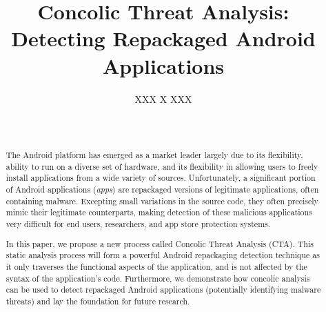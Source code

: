 \documentclass{sig-alternate}
\newif\ifisnopii
\begin{document}
%

\title{Concolic Threat Analysis: Detecting Repackaged Android Applications}
%
\ifisnopii %
\author{
%
\alignauthor
Daniel E. Krutz, Samuel A. Malachowsky, Patrick J. McAfee, and Justin M. Peterson\\ 	
	\affaddr{Software Engineering Department}\\
       \affaddr{Rochester Institute of Technology}\\
       \affaddr{1 Lomb Memorial Drive}\\
       \affaddr{Rochester, NY 14623} \\
       \email{\{dxkvse, samvse, pjm4439, jmp3833\}@rit.edu}
} %
\else %
\author{
\alignauthor
XXX X XXX\\
       \\
       \\
}
\fi %

\maketitle
\begin{abstract}

The Android platform has emerged as a market leader largely due to its flexibility, ability to run on a diverse set of hardware, and its flexibility in allowing users to freely install applications from a wide variety of sources. Unfortunately, a significant portion of Android applications (\emph{apps}) are repackaged versions of legitimate applications, often containing malware. Excepting small variations in the source code, they often precisely mimic their legitimate counterparts, making detection of these malicious applications very difficult for end users, researchers, and app store protection systems.

In this paper, we propose a new process called Concolic Threat Analysis (CTA). This static analysis process will form a powerful Android repackaging detection technique as it only traverses the functional aspects of the application, and is not affected by the syntax of the application's code. Furthermore, we demonstrate how concolic analysis can be used to detect repackaged Android applications (potentially identifying malware threats) and lay the foundation for future research.
\end{abstract}
\end{document}
